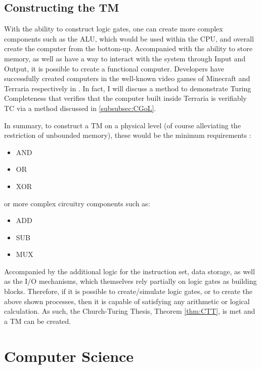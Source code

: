 \subsection{Constructing the TM}\label{subsec:CreateTM}

With the ability to construct logic gates, one can create more complex components such as the ALU, which would be used within the CPU, and overall create the computer from the bottom-up.
Accompanied with the ability to store memory, as well as have a way to interact with the system through Input and Output, it is possible to create a functional computer.
Developers have successfully created computers in the well-known video games of Minecraft and Terraria respectively in \cite{MCTM,TerrariaTM,TerrariaTMGH}.
In fact, I will discuss a method to demonstrate Turing Completeness that verifies that the computer built inside Terraria is verifiably TC via a method discussed in \ref{subsubsec:CGoL}.

In summary, to construct a TM on a physical level (of course alleviating the restriction of unbounded memory), these would be the minimum requirements \cite{nand2tetris,ELTCompSys}:

\begin{itemize}
    \item AND
    \item OR
    \item XOR
\end{itemize}

or more complex circuitry components such as:

\begin{itemize}
    \item ADD
    \item SUB
    \item MUX
\end{itemize}

Accompanied by the additional logic for the instruction set, data storage, as well as the I/O mechanisms, which themselves rely partially on logic gates as building blocks.
Therefore, if it is possible to create/simulate logic gates, or to create the above shown processes, then it is capable of satisfying any arithmetic or logical calculation.
As such, the Church-Turing Thesis, Theorem \ref{thm:CTT}, is met and a TM can be created.

\section{Computer Science}\label{sec:CompSci}

